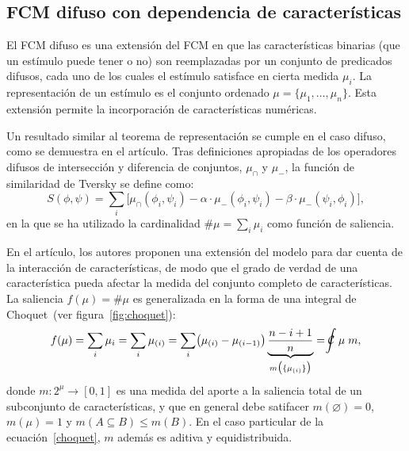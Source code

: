 \documentclass[spanish]{article}
\newcommand{\choquet}{\mathcal{C}\mspace{-18mu}\int}
\begin{document}
\subsection{FCM difuso con dependencia de características}
El FCM difuso es una extensión del FCM en que las características binarias (que un estímulo puede
tener o no) son reemplazadas por un conjunto de predicados difusos, cada uno de los cuales el
estímulo satisface en cierta medida $\mu_i$.  La representación de un estímulo es el conjunto
ordenado $\mu = \{\mu_1, \ldots, \mu_n\}$.  Esta extensión permite la incorporación de
características numéricas.

Un resultado similar al teorema de representación se cumple en el caso difuso, como se demuestra en
el artículo.  Tras definiciones apropiadas de los operadores difusos de intersección y diferencia de
conjuntos, $\mu_\cap$ y $\mu_-$, la función de similaridad de Tversky se define como:
\begin{equation}
    S(\phi, \psi) = \sum_i\bigl[\mu_\cap (\phi_i, \psi_i) -
                          \alpha\cdot\mu_-  (\phi_i, \psi_i)   -
                          \beta \cdot\mu_-  (\psi_i, \phi_i)\bigr],
\end{equation}
en la que se ha utilizado la cardinalidad $\#\mu = \sum_i\mu_i$ como función de saliencia.

En el artículo, los autores proponen una extensión del modelo para dar cuenta de la
interacción de características, de modo que el grado de verdad de una característica pueda afectar
la medida del conjunto completo de características.  La saliencia $f(\mu) = \#\mu$ es
generalizada en la forma de una integral de Choquet~(ver figura~\ref{fig:choquet}):
\begin{equation}
    f(\mu) = \sum_i\mu_i = \sum_i\mu_{(i)}
           = \sum_i \bigl(\mu_{(i)} - \mu_{(i-1)}\bigr)
             \underbrace{\frac{n-i+1}{n}}_{m\bigl(\{\mu_{(i)}\}\bigr)}
           = \choquet \mu\;m,
    \label{choquet}
\end{equation}
donde $m: 2^\mu\to{}[0, 1]$ es una medida del aporte a la saliencia total de un subconjunto de
características, y que en general debe satifacer
$m(\varnothing)=0$,
$m(\mu)=1$ y
$m(A\subseteq B)\leq m(B)$.  En el caso particular de la ecuación~\ref{choquet}, $m$ además es aditiva y
equidistribuida.
\end{document}
